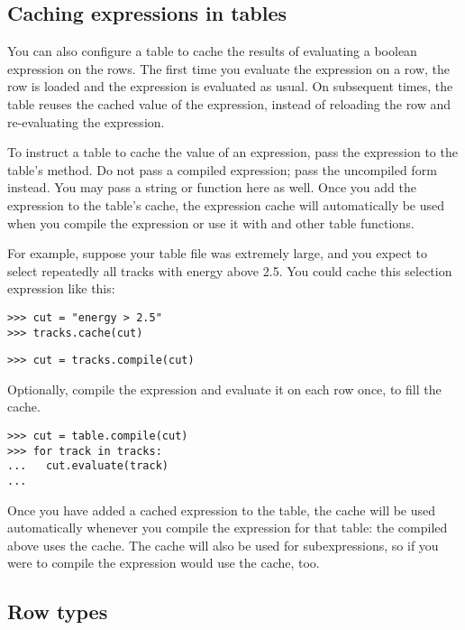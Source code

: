 \subsection{Caching expressions in tables}

You can also configure a table to cache the results of evaluating a
boolean expression on the rows.  The first time you evaluate the
expression on a row, the row is loaded and the expression is evaluated
as usual.  On subsequent times, the table reuses the cached value of the
expression, instead of reloading the row and re-evaluating the
expression. 

To instruct a table to cache the value of an expression, pass the
expression to the table's  method.  Do not pass a compiled
expression; pass the uncompiled form instead.  You may pass a string or
function here as well.  Once you add the expression to the table's
cache, the expression cache will automatically be used when you compile
the expression or use it with  and other table functions.

For example, suppose your table file  was extremely
large, and you expect to select repeatedly all tracks with energy above
2.5.  You could cache this selection expression like this:
\begin{verbatim}
>>> cut = "energy > 2.5"
>>> tracks.cache(cut)
\end{verbatim}
\begin{verbatim}
>>> cut = tracks.compile(cut)
\end{verbatim}
Optionally, compile the expression and evaluate it on each row once, to
fill the cache.
\begin{verbatim}
>>> cut = table.compile(cut)
>>> for track in tracks:
...   cut.evaluate(track)
... 
\end{verbatim}

Once you have added a cached expression to the table, the cache will be
used automatically whenever you compile the expression for that table:
the compiled  above uses the cache.  The cache will also be
used for subexpressions, so if you were to compile the expression
 would use the cache, too.

\subsection{Row types}

